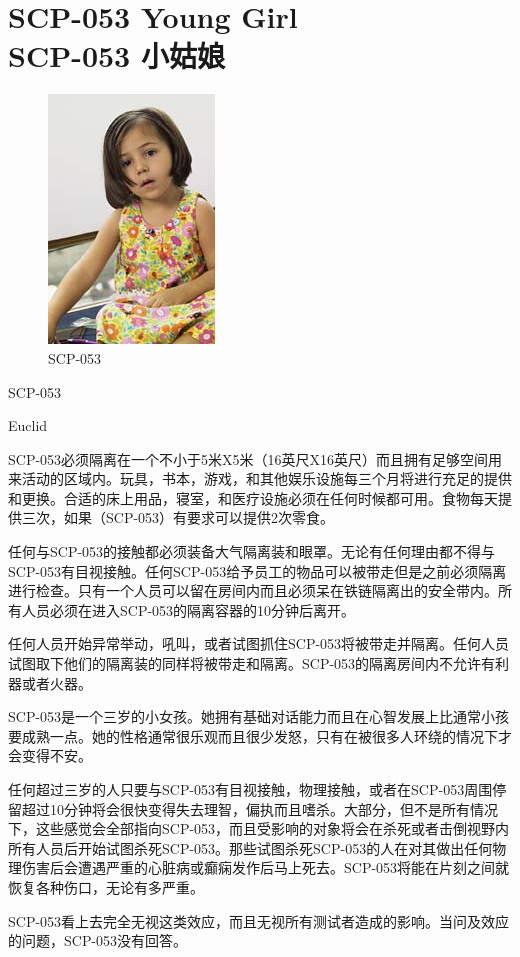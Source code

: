 \chapter[SCP-053 小姑娘]{
    SCP-053 Young Girl\\
    SCP-053 小姑娘
}

\label{chap:SCP-053}

\begin{figure}[H]
    \centering
    \includegraphics[width=0.3\linewidth]{images/SCP-053.jpg}
    \caption*{SCP-053}
\end{figure}

SCP-053

Euclid

SCP-053必须隔离在一个不小于5米X5米（16英尺X16英尺）而且拥有足够空间用来活动的区域内。玩具，书本，游戏，和其他娱乐设施每三个月将进行充足的提供和更换。合适的床上用品，寝室，和医疗设施必须在任何时候都可用。食物每天提供三次，如果（SCP-053）有要求可以提供2次零食。

任何与SCP-053的接触都必须装备大气隔离装和眼罩。无论有任何理由都不得与SCP-053有目视接触。任何SCP-053给予员工的物品可以被带走但是之前必须隔离进行检查。只有一个人员可以留在房间内而且必须呆在铁链隔离出的安全带内。所有人员必须在进入SCP-053的隔离容器的10分钟后离开。

任何人员开始异常举动，吼叫，或者试图抓住SCP-053将被带走并隔离。任何人员试图取下他们的隔离装的同样将被带走和隔离。SCP-053的隔离房间内不允许有利器或者火器。

SCP-053是一个三岁的小女孩。她拥有基础对话能力而且在心智发展上比通常小孩要成熟一点。她的性格通常很乐观而且很少发怒，只有在被很多人环绕的情况下才会变得不安。

任何超过三岁的人只要与SCP-053有目视接触，物理接触，或者在SCP-053周围停留超过10分钟将会很快变得失去理智，偏执而且嗜杀。大部分，但不是所有情况下，这些感觉会全部指向SCP-053，而且受影响的对象将会在杀死或者击倒视野内所有人员后开始试图杀死SCP-053。那些试图杀死SCP-053的人在对其做出任何物理伤害后会遭遇严重的心脏病或癫痫发作后马上死去。SCP-053将能在片刻之间就恢复各种伤口，无论有多严重。

SCP-053看上去完全无视这类效应，而且无视所有测试者造成的影响。当问及效应的问题，SCP-053没有回答。
